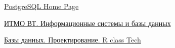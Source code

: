 \documentclass{article}
\begin{document}
\begin{thebibliography}{9}
    \item \href{https://www.postgresql.org}{
        PostgreSQL Home Page}

    \item \href{https://se.ifmo.ru/documents/10180/733702/isbd-2021-2.6.pdf/e47a2e01-d445-e017-070f-a300ecdb71a8}{
        ИТМО ВТ. Информационные системы и базы данных}

    \item \href{https://youtu.be/HnRXzrg3Sd4?si=Il3rxvHIpw93Wx0J}{
        Базы данных. Проектирование. R class Tech}
\end{thebibliography}
\end{document}
